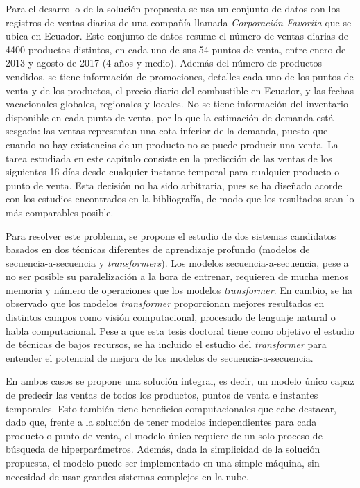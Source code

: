 Para el desarrollo de la solución propuesta se usa un conjunto de datos con los registros de ventas diarias de una compañía llamada \textit{Corporación Favorita} que se ubica en Ecuador. Este conjunto de datos resume el número de ventas diarias de 4400 productos distintos, en cada uno de sus 54 puntos de venta, entre enero de 2013 y agosto de 2017 (4 años y medio). Además del número de productos vendidos, se tiene información de promociones, detalles cada uno de los puntos de venta y de los productos, el precio diario del combustible en Ecuador, y las fechas vacacionales globales, regionales y locales. No se tiene información del inventario disponible en cada punto de venta, por lo que la estimación de demanda está sesgada: las ventas representan una cota inferior de la demanda, puesto que cuando no hay existencias de un producto no se puede producir una venta. La tarea estudiada en este capítulo consiste en la predicción de las ventas de los siguientes 16 días desde cualquier instante temporal para cualquier producto o punto de venta. Esta decisión no ha sido arbitraria, pues se ha diseñado acorde con los estudios encontrados en la bibliografía, de modo que los resultados sean lo más comparables posible. 

Para resolver este problema, se propone el estudio de dos sistemas candidatos basados en dos técnicas diferentes de aprendizaje profundo (modelos de secuencia-a-secuencia y \textit{transformers}). Los modelos secuencia-a-secuencia, pese a no ser posible su paralelización a la hora de entrenar, requieren de mucha menos memoria y número de operaciones que los modelos \textit{transformer}. En cambio, se ha observado que los modelos \textit{transformer} proporcionan mejores resultados en distintos campos como visión computacional, procesado de lenguaje natural o habla computacional. Pese a que esta tesis doctoral tiene como objetivo el estudio de técnicas de bajos recursos, se ha incluido el estudio del \textit{transformer} para entender el potencial de mejora de los modelos de secuencia-a-secuencia. 

En ambos casos se propone una solución integral, es decir, un modelo único capaz de predecir las ventas de todos los productos, puntos de venta e instantes temporales. Esto también tiene beneficios computacionales que cabe destacar, dado que, frente a la solución de tener modelos independientes para cada producto o punto de venta, el modelo único requiere de un solo proceso de búsqueda de hiperparámetros. Además, dada la simplicidad de la solución propuesta, el modelo puede ser implementado en una simple máquina, sin necesidad de usar grandes sistemas complejos en la nube. 

